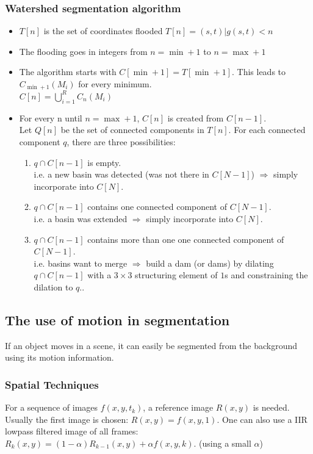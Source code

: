 \subsubsection{Watershed segmentation algorithm}
\begin{itemize}
\item $T[n]$ is the set of coordinates flooded \qquad $T[n] = {(s,t)|g(s,t)<n}$
\item The flooding goes in integers from $n=\min+1$ to $n=\max+1$
\item The algorithm starts with $C[\min+1]=T[\min+1]$. This leads to $C_{\min+1}(M_i)$ for every minimum. \\ $C[n]=\bigcup\limits_{i=1}^{R}C_n(M_i)$
\item For every n until $n=\max+1$, $C[n]$ is created from $C[n-1]$. \\
		Let $Q[n]$ be the set of connected components in $T[n]$. For each connected component $q$, there are three possibilities:
	\begin{enumerate}
		\item $q \cap C[n-1]$ is empty. \\ i.e. a new basin was detected (was not there in $C[N-1]$) $\Rightarrow$ simply incorporate into $C[N]$.
		\item $q \cap C[n-1]$ contains one connected component of $C[N-1]$. \\ i.e. a basin was extended $\Rightarrow$ simply incorporate into $C[N]$.
		\item $q \cap C[n-1]$ contains more than one one connected component of $C[N-1]$. \\ i.e. basins want to merge $\Rightarrow$ build a dam (or dams) by dilating $q \cap C[n-1]$ with a $3 \times 3$ structuring element of $1$s and constraining the dilation to $q$..
	\end{enumerate}
\end{itemize}

\subsection{The use of motion in segmentation}
If an object moves in a scene, it can easily be segmented from the background using its motion information.

\subsubsection{Spatial Techniques}
For a sequence of images $f(x,y,t_k)$, a reference image $R(x,y)$ is needed. 
Usually the first image is chosen: $R(x,y) = f(x,y,1)$. 
One can also use a IIR lowpass filtered image of all frames: $R_k(x,y) = (1-\alpha) R_{k-1}(x,y) + \alpha f(x,y,k)$. (using a small $\alpha$) \\


